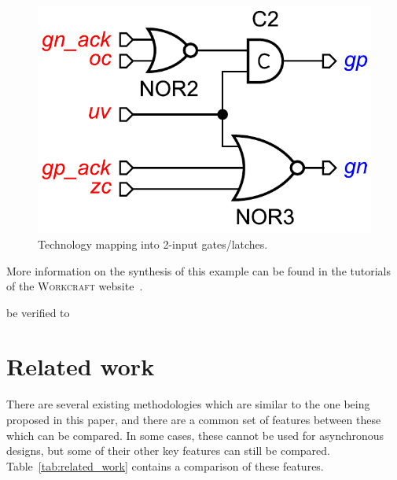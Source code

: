 \documentclass[british, journal]{IEEEtran}
\newcommand{\noun}[1]{\textsc{#1}}
\begin{document}
\begin{figure}[h]
\begin{centering}
\includegraphics[scale=0.3]{Images/circuit-buck-deco2-wc}
\par\end{centering}
\protect\caption{\label{fig:circuit-buck-deco2}Technology mapping into 2-input
gates/latches.}
\end{figure}

More information on the synthesis of this example can be found in the tutorials
of the \noun{Workcraft} website~\cite{Workcraft_website}.

be verified to


\section{Related work\label{sec:related-work}}

There are several existing methodologies which are similar to the
one being proposed in this paper, and there are a common set of features between
these which can be compared.
In some cases, these cannot be used for asynchronous designs, but some of their
other key features can still be compared.
Table~\ref{tab:related_work} contains a comparison of these features.
\end{document}
